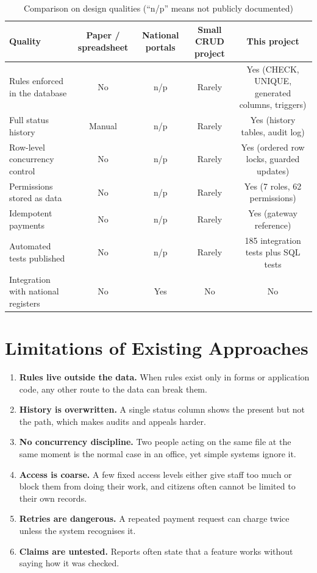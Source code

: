\begin{table}[H]
\centering\small
\caption{Comparison on design qualities (``n/p'' means not publicly documented)}\label{tab:compare}
\begin{tabularx}{\linewidth}{@{}p{3.4cm}CCCC@{}}
\toprule
\textbf{Quality} & \textbf{Paper / spreadsheet} & \textbf{National portals} & \textbf{Small CRUD project} & \textbf{This project}\\ \midrule
Rules enforced in the database & No & n/p & Rarely & Yes (CHECK, UNIQUE, generated columns, triggers)\\
Full status history & Manual & n/p & Rarely & Yes (history tables, audit log)\\
Row-level concurrency control & No & n/p & Rarely & Yes (ordered row locks, guarded updates)\\
Permissions stored as data & No & n/p & Rarely & Yes (7 roles, 62 permissions)\\
Idempotent payments & No & n/p & Rarely & Yes (gateway reference)\\
Automated tests published & No & n/p & Rarely & 185 integration tests plus SQL tests\\
Integration with national registers & No & Yes & No & No\\
\bottomrule
\end{tabularx}
\end{table}

\section{Limitations of Existing Approaches}
\begin{enumerate}
\item \textbf{Rules live outside the data.} When rules exist only in forms or application code, any other route to the data can break them.
\item \textbf{History is overwritten.} A single status column shows the present but not the path, which makes audits and appeals harder.
\item \textbf{No concurrency discipline.} Two people acting on the same file at the same moment is the normal case in an office, yet simple systems ignore it.
\item \textbf{Access is coarse.} A few fixed access levels either give staff too much or block them from doing their work, and citizens often cannot be limited to their own records.
\item \textbf{Retries are dangerous.} A repeated payment request can charge twice unless the system recognises it.
\item \textbf{Claims are untested.} Reports often state that a feature works without saying how it was checked.
\end{enumerate}

